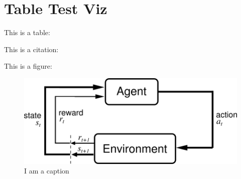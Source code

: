 \section{Table Test Viz}

This is a table:




This is a citation: \cite{patchCore2022}


This is a figure: 

\begin{figure}[ht]
    \centering
    \includegraphics[width=.5\textwidth]{figures/AgentEnviornment.png}
    \caption{I am a caption}
    \label{fig:my_label}
\end{figure}


